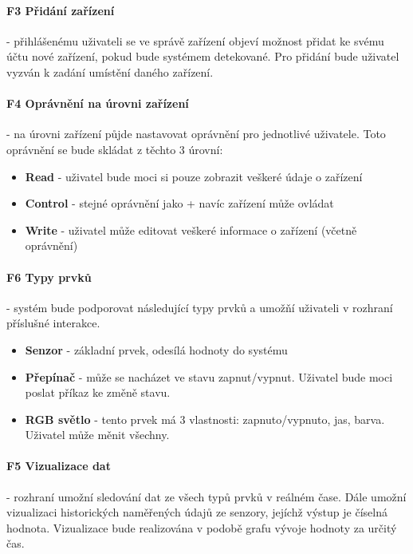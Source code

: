 \documentclass[thesis=B,czech]{FITthesis}[2019/12/23]
\begin{document}
\paragraph{F3 Přidání zařízení}
- přihlášenému uživateli se ve správě zařízení objeví možnost přidat ke svému účtu nové zařízení, pokud bude systémem detekované. Pro přidání bude uživatel vyzván k zadání umístění daného zařízení.

\paragraph{F4 Oprávnění na úrovni zařízení}
- na úrovni zařízení půjde nastavovat oprávnění pro jednotlivé uživatele. Toto oprávnění se bude skládat z těchto 3 úrovní:
\begin{itemize}
    \item \textbf{Read} - uživatel bude moci si pouze zobrazit veškeré údaje o zařízení
    \item \textbf{Control} - stejné oprávnění jako  + navíc zařízení může ovládat
    \item \textbf{Write} - uživatel může editovat veškeré informace o zařízení (včetně oprávnění)
\end{itemize}

\paragraph{F6 Typy prvků}
- systém bude podporovat následující typy prvků a umožňí uživateli v rozhraní příslušné interakce.
\begin{itemize}
    \item \textbf{Senzor} - základní prvek, odesílá hodnoty do systému
    \item \textbf{Přepínač} - může se nacházet ve stavu zapnut/vypnut. Uživatel bude moci poslat příkaz ke změně stavu.
    \item \textbf{RGB světlo} - tento prvek má 3 vlastnosti: zapnuto/vypnuto, jas, barva. Uživatel může měnit všechny.
\end{itemize}

\paragraph{F5 Vizualizace dat}
- rozhraní umožní sledování dat ze všech typů prvků v reálném čase. Dále umožní vizualizaci historických naměřených údajů ze senzory, jejíchž výstup je číselná hodnota. Vizualizace bude realizována v podobě grafu vývoje hodnoty za určitý čas.
\end{document}
